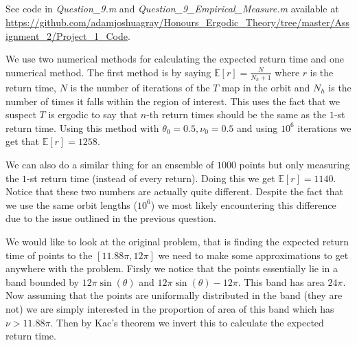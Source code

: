\documentclass{unswmaths}
\begin{document}
\subsection{}
See code in \emph{Question\_9.m} and \emph{Question\_9\_Empirical\_Measure.m} available at \url{https://github.com/adamjoshuagray/Honours_Ergodic_Theory/tree/master/Assignment_2/Project_1_Code}.


We use two numerical methods for calculating the expected return time and one numerical method. The first method is by saying $ \mathbb{E}[r] = \frac{N}{N_h + 1}$ where $ r $ is the return time, $ N $ is the number of iterations of the $ T $ map in the orbit and $ N_h $ is the number of times it falls within the region of interest. This uses the fact that we suspect $ T $ is ergodic to say that $ n$-th return times should be the same as the $ 1$-st return time.
Using this method with $ \theta_0 = 0.5, \nu_0 = 0.5 $ and using $ 10^6 $ iterations we get that $ \mathbb{E}[ r] = 1258 $.

We can also do a similar thing for an ensemble of $ 1000 $ points but only measuring the $1$-st return time (instead of every return). Doing this we get $ \mathbb{E}[r] = 1140 $. Notice that these two numbers are actually quite different. Despite the fact that we use the same orbit lengths ($10^6$) we most likely encountering this difference due to the issue outlined in the previous question.

We would like to look at the original problem, that is finding the expected return time of points to the $ [11.88\pi, 12\pi] $ we need to make some approximations to get anywhere with the problem. Firsly we notice that the points essentially lie in a band bounded by $ 12\pi\sin(\theta) $ and $ 12\pi\sin(\theta) - 12\pi $. This band has area $ 24\pi $. Now assuming that the points are uniformally distributed in the band (they are not) we are simply interested in the proportion of area of this band which has $ \nu > 11.88\pi $. Then by Kac's theorem we invert this to calculate the expected return time.
\end{document}
